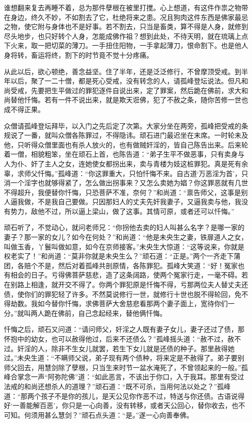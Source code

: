 \documentclass[a4paper,12pt,UTF8,twoside]{ctexbook}
\begin{document}
谁想翻来复去再睡不着，总为那件孽根在被里打搅。心上想道，有这件作祟之物带在身边，终久不妙，不如割去了它，杜绝将来之患。况且狗肉这件东西是佛家最忌之物，使它附与身体也不是好事。若不割去，只当是畜类，算不得是人身，就修到尽头地步，也只好转个人身，怎能成佛作祖？想到此处，不待天明，就在琉璃上点下火来，取一把切菜的薄刀。一手扭住阳物，一手拿起薄刀，恨命割下。也是他人身将转，畜运将终，割下的时节竟不觉十分疼痛。

从此以后，欲心顿绝，善念益坚。住了半年，还是泛泛修行，不曾摩顶受戒。到半年以后，聚了一二十僧，都是死心受戒，没有转念的人，请孤峰登坛说法。但凡和尚受戒，先要把生平做过的罪犯逐件自说出来，定了罪案，然后跪在佛前，求大和尚替他忏悔。若有一件不说出来，就是欺天诳佛，犯了不赦之条，随你苦修一世也成不得正果。

众僧请孤峰登坛拜毕，以入门之先后定了次第。大家分坐在两旁，孤峰把受戒的条规说了一番，就叫众僧各陈罪过，不得隐讳。顽石进门最迟坐在末席。一时轮未及他，只听得众僧里面也有杀人放火的，也有做贼奸淫的，皆自己陈告出来。后来轮着一僧，相貌粗笨，坐在顽石上首，也陈告道：“弟子生平不做恶事，只有卖身与人为仆、奸了主人之女，连她使女都拐出来，卖与青楼为妓这桩罪犯。真是死有余辜，求师父忏悔。”孤峰道：“你这罪重大，只怕忏悔不来。自古道‘万恶淫为首’，只消一个淫字也就够得紧了，怎么做出拐事来？又怎么卖她为娼？你这罪恶就有几世不得超升，我便替你忏悔，只恐菩萨不准，奈何？”和尚道：“禀告师父，这事是别人逼我做，不是我自己要做。只因那妇人的丈夫先奸我妻子，又逼我卖与他，我没有势力，敌他不过，所以逼上梁山，做了这事。其情可原，或者还可以忏悔。”

顽石听了，不觉动心，就问老师兄：“你拐他去卖的妇人叫甚么名字？是哪一家的妻子？那一家的女儿？如今在何处？”和尚道：“他是未央生之妻，铁扉道人之女，叫做玉香，丫鬟叫做如意，如今在京师接客。”未央生大惊道：“这等说来，你就是权老实了！”和尚道：“莫非你就是未央生么？”顽石道：“正是。”两个一齐走下蒲团，各赔个不是，然后对着孤峰共剖原情，各陈罪犯。孤峰大笑道：“好！冤家也有相会的日子。亏得佛菩萨慈悲，造了这条阔路，使两个冤家行走，一毫不碍。若在别路上相逢，就开交不得了。你两个罪犯原是忏悔不得，亏那两位夫人替丈夫还债，使你们的罪犯轻了许多。不然莫说修行一世，就修行十世也脱不得轮回，免不得劫数。我如今替你忏悔，求佛菩萨大舍慈悲看那两个妻子面上，宽待你们一分。”就叫两人跪在佛前，自己念起经来，替他俩忏悔。

忏悔之后，顽石又问道：“请问师父，奸淫之人既有妻子女儿，妻子还过了债，那怀抱中的幼女，也可以赦得他过，后来不还债么？”孤峰摇头道：“赦不过，赦不过。奸淫的人，除非不生女儿就罢，若生下女儿就是还债的种子。那里赦得她过。”未央生道：“不瞒师父说，弟子现有两个债种，将来定是不赦得了。弟子要别师父回去，用慧剑除了孽根，只当生来时节一盆水淹死了，不曾领起来的一般。”孤峰合掌念一声“阿弥陀佛”道：“如此恶言，不该出于你口，入于我耳。那里有受过法戒的和尚还想杀人的道理？”顽石道：“既不可杀，当用何法以处之？”孤峰道：“那两个孩子不是你的孩儿，是天公见你作恶不过，特送与你还债。古语说得好‘一善能解百恶’，你只是一心向善，没有转移，或者天公回心，替你收去，也不可知。何须用甚么慧剑？”顽石点头道：“是。”遂一心向善奉佛。
\end{document}
